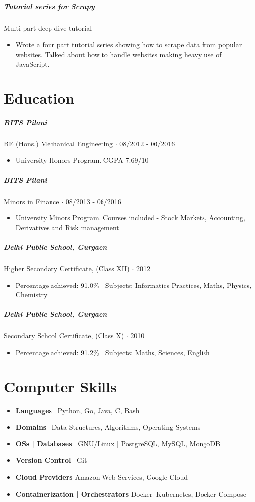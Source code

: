 \documentclass[10pt,letterpaper]{article}
\begin{document}
\subparagraph{Tutorial series for Scrapy}
Multi-part deep dive tutorial
\begin{itemize}
    \item Wrote a four part tutorial series showing how to scrape data from popular websites. Talked about how to handle websites making heavy use of JavaScript.
\end{itemize}

\section*{Education}

\subparagraph{BITS Pilani}
 BE (Hons.) Mechanical Engineering $\cdot$ 08/2012 - 06/2016
\begin{itemize}
    \item University Honors Program.  CGPA 7.69/10
\end{itemize}

\subparagraph{BITS Pilani}
Minors in Finance $\cdot$ 08/2013 - 06/2016
\begin{itemize}
    \item University Minors Program. Courses included - Stock Markets, Accounting, Derivatives and Risk management
\end{itemize}

\subparagraph{Delhi Public School, Gurgaon}
Higher Secondary Certificate, (Class XII) $\cdot$ 2012
\begin{itemize}
    \item Percentage achieved: 91.0\% $\cdot$ Subjects: Informatics Practices, Maths, Physics, Chemistry
\end{itemize}

\subparagraph{Delhi Public School, Gurgaon}
Secondary School Certificate, (Class X) $\cdot$ 2010
\begin{itemize}
    \item Percentage achieved: 91.2\% $\cdot$ Subjects: Maths, Sciences, English
\end{itemize}

\section*{Computer Skills}

\begin{itemize}
    \item \textbf{Languages} \ Python, Go, Java, C, Bash
    \item \textbf{Domains} \ Data Structures, Algorithms, Operating Systems
    \item \textbf{OSs | Databases} \ GNU/Linux | PostgreSQL, MySQL, MongoDB
    \item \textbf{Version Control} \ Git
    \item \textbf{Cloud Providers} Amazon Web Services, Google Cloud
    \item \textbf{Containerization | Orchestrators} Docker, Kubernetes, Docker Compose
\end{itemize}
\end{document}
